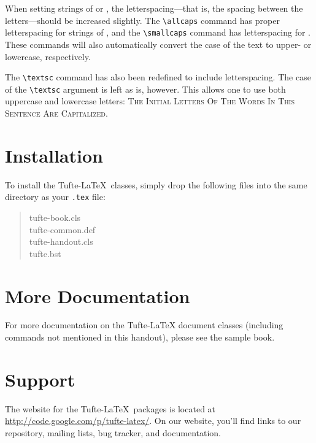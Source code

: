 \documentclass{tufte-handout}
\begin{document}
When setting strings of  or , the
letter\-spacing---that is, the spacing between the letters---should be
increased slightly.\cite{Bringhurst2005}  The \Verb|\allcaps| command has proper letterspacing for
strings of , and the \Verb|\smallcaps| command
has letterspacing for .  These commands
will also automatically convert the case of the text to upper- or
lowercase, respectively.

The \Verb|\textsc| command has also been redefined to include
letterspacing.  The case of the \Verb|\textsc| argument is left as is,
however.  This allows one to use both uppercase and lowercase letters:
\textsc{The Initial Letters Of The Words In This Sentence Are Capitalized.}



\section{Installation}\label{sec:installation}
To install the Tufte-\LaTeX\ classes, simply drop the
following files into the same directory as your \texttt{.tex}
file:
\begin{quote}
  \ttfamily
  tufte-book.cls\\
  tufte-common.def\\
  tufte-handout.cls\\
  tufte.bst
\end{quote}




\section{More Documentation}\label{sec:more-doc}
For more documentation on the Tufte-\LaTeX{} document classes (including commands not
mentioned in this handout), please see the sample book.

\section{Support}\label{sec:support}

The website for the Tufte-\LaTeX\ packages is located at
\url{http://code.google.com/p/tufte-latex/}.  On our website, you'll find
links to our  repository, mailing lists, bug tracker, and documentation.



\end{document}
